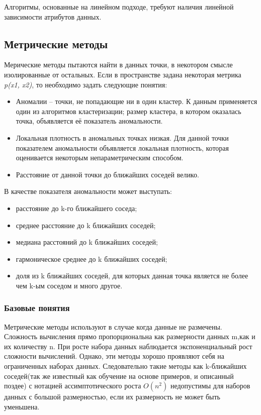 Алгоритмы, основанные на линейном подходе, требуют  наличия линейной зависимости атрибутов данных. 
\subsection{Метрические методы}
Мерические методы пытаются найти в данных точки, в некотором смысле
изолированные от остальных\cite{Book01}. Если в пространстве задана некоторая метрика \textit{p(x1, x2)}, то необходимо задать следующие понятия:
\begin{itemize}
	\item  Аномалии – точки, не попадающие ни в один кластер. К данным применяется один из алгоритмов кластеризации; размер кластера, в котором оказалась точка, объявляется её показатель аномальности.
	\item Локальная плотность в аномальных точках низкая. Для данной точки показателем аномальности объявляется локальная плотность, которая оценивается некоторым непараметрическим способом.
	\item Расстояние от данной точки до ближайших соседей велико.
\end{itemize}
 В качестве показателя аномальности может выступать:
 \begin{itemize}
\item расстояние до k-го ближайшего соседа;
\item среднее расстояние до k ближайших соседей;
\item медиана расстояний до k ближайших соседей;
\item гармоническое среднее до k ближайших соседей;
\item доля из k ближайших соседей, для которых данная точка является не
более чем k-ым соседом и много другое.
\end{itemize}
\subsubsection{Базовые понятия}
Метрические методы используют в случае когда данные не размечены. Сложность вычисления прямо пропорциональна как размерности данных m,как и их количеству n. При росте набора данных наблюдается экспоненциальный рост сложности вычислений. Однако, эти методы хорошо проявляют себя на ограниченных наборах данных\cite{Book07}. Следовательно такие методы как k-ближайших соседей(так же известный как обучение на основе примеров, и описанный поздее) с нотацией ассимптотического роста $O(n^2)$ недопустимы для наборов данных с большой размерностью, если их размерность не может быть уменьшена.

